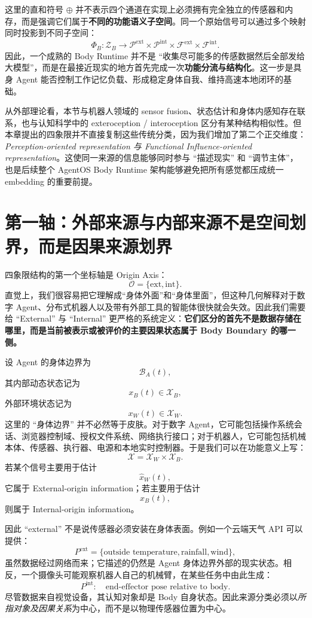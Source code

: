 这里的直和符号 $\oplus$ 并不表示四个通道在实现上必须拥有完全独立的传感器和内存，而是强调它们属于\textbf{不同的功能语义子空间}。同一个原始信号可以通过多个映射同时投影到不同子空间：
\[
\Phi_B:
\mathcal Z_B
\rightarrow
\mathcal P^{\mathrm{ext}}
\times
\mathcal P^{\mathrm{int}}
\times
\mathcal F^{\mathrm{ext}}
\times
\mathcal F^{\mathrm{int}}.
\]
因此，一个成熟的 Body Runtime 并不是 ``收集尽可能多的传感数据然后全部发给大模型''，而是在最接近现实的地方首先完成一次\textbf{功能分流与结构化}。这一步是具身 Agent 能否控制工作记忆负载、形成稳定身体自我、维持高速本地闭环的基础。

从外部理论看，本节与机器人领域的 sensor fusion、状态估计和身体内感知存在联系，也与认知科学中的 exteroception / interoception 区分有某种结构相似性。但本章提出的四象限并不直接复制这些传统分类，因为我们增加了第二个正交维度：\emph{Perception-oriented representation 与 Functional Influence-oriented representation}。这使同一来源的信息能够同时参与 ``描述现实'' 和 ``调节主体''，也是后续整个 AgentOS Body Runtime 架构能够避免把所有感觉都压成统一 embedding 的重要前提。

\section{第一轴：外部来源与内部来源不是空间划界，而是因果来源划界}
\label{sec:origin-axis}

四象限结构的第一个坐标轴是 Origin Axis：
\[
\mathcal O
=
\{\mathrm{ext},\mathrm{int}\}.
\]
直觉上，我们很容易把它理解成``身体外面''和``身体里面''，但这种几何解释对于数字 Agent、分布式机器人以及带有外部工具的智能体很快就会失效。因此我们需要给 ``External'' 与 ``Internal'' 更严格的系统定义：\textbf{它们区分的首先不是数据存储在哪里，而是当前被表示或被评价的主要因果状态属于 Body Boundary 的哪一侧。}

设 Agent 的身体边界为
\[
\mathcal B_A(t),
\]
其内部动态状态记为
\[
x_B(t)\in\mathcal X_B,
\]
外部环境状态记为
\[
x_W(t)\in\mathcal X_W.
\]
这里的 ``身体边界'' 并不必然等于皮肤。对于数字 Agent，它可能包括操作系统会话、浏览器控制域、授权文件系统、网络执行接口；对于机器人，它可能包括机械本体、传感器、执行器、电源和本地实时控制器。于是我们可以在功能意义上写：
\[
\mathcal X
=
\mathcal X_W
\times
\mathcal X_B.
\]
若某个信号主要用于估计
\[
\hat{x}_W(t),
\]
它属于 External-origin information；若主要用于估计
\[
\hat{x}_B(t),
\]
则属于 Internal-origin information。

因此 ``external'' 不是说传感器必须安装在身体表面。例如一个云端天气 API 可以提供：
\[
P^{\mathrm{ext}}=
\{\text{outside temperature},\text{rainfall},\text{wind}\},
\]
虽然数据经过网络而来；它描述的仍然是 Agent 身体边界外部的现实状态。相反，一个摄像头可能观察机器人自己的机械臂，在某些任务中由此生成：
\[
P^{\mathrm{int}}
:
\quad
\text{end-effector pose relative to body}.
\]
尽管数据来自视觉设备，其认知对象却是 Body 自身状态。因此来源分类必须以\emph{所指对象及因果关系}为中心，而不是以物理传感器位置为中心。


